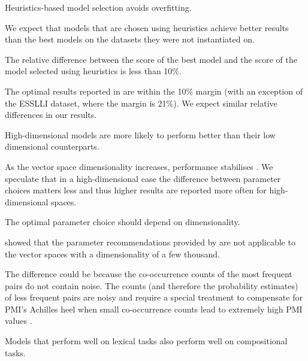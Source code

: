 \begin{hyp}
\label{hyp:overfitting}
Heuristics-based model selection avoids overfitting.
\end{hyp}

We expect that models that are chosen using heuristics achieve better results than the best models on the datasets they were not instantiated on.

\begin{hyp}
\label{hyp:10percent}
The relative difference between the score of the best model and the score of the model selected using heuristics is less than 10\%.
\end{hyp}

The optimal results reported in  are within the 10\% margin (with an exception of the ESSLLI dataset, where the margin is 21\%). We expect similar relative differences in our results.

\begin{hyp}
\label{hyp:var}
High-dimensional models are more likely to perform better than their low dimensional counterparts.
\end{hyp}

As the vector space dimensionality increases, performance stabilises \cite{kiela-clark:2014:CVSC,BullinariaLevy2012,lapesa2014large}. We speculate that in a high-dimensional case the difference between parameter choices matters less and thus higher results are reported more often for high-dimensional spaces.

\begin{hyp}
\label{hyp:dimen}
The optimal parameter choice should depend on dimensionality.
\end{hyp}

 showed that the parameter recommendations provided by  are not applicable to the vector spaces with a dimensionality of a few thousand.

The difference could be because the co-occurrence counts of the most frequent pairs do not contain noise. The counts (and therefore the probability estimates) of less frequent pairs are noisy and require a special treatment to compensate for PMI's Achilles heel when small co-occurrence counts lead to extremely high PMI values \cite{TACL570}.

\begin{hyp}
\label{hyp:not-lextocomp}
Models that perform well on lexical tasks also perform well on compositional tasks.
\end{hyp}

